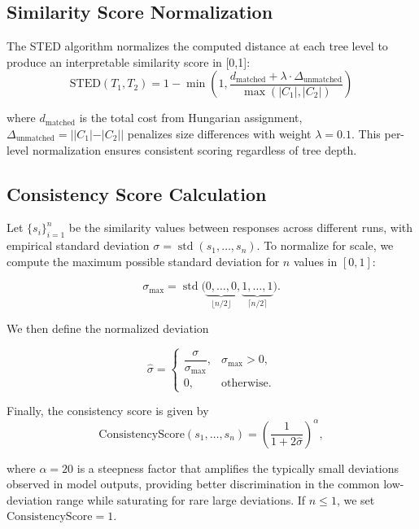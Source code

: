 \documentclass{article}
\begin{document}
\subsection{Similarity Score Normalization}

The STED algorithm normalizes the computed distance at each tree level to produce an interpretable similarity score in [0,1]:
\vspace{-2mm}
\begin{equation}
\text{STED}(T_1, T_2) = 1 - \min\left(1, \frac{d_{\text{matched}} + \lambda \cdot \Delta_{\text{unmatched}}}{\max(|C_1|, |C_2|)}\right)
\end{equation}

where $d_{\text{matched}}$ is the total cost from Hungarian assignment, $\Delta_{\text{unmatched}} = ||C_1| - |C_2||$ penalizes size differences with weight $\lambda = 0.1$. This per-level normalization ensures consistent scoring regardless of tree depth.

\subsection{Consistency Score Calculation}

Let $\{s_i\}_{i=1}^n$ be the similarity values between responses across different runs, with empirical standard deviation $\sigma = \operatorname{std}(s_1, \dots, s_n)$. To normalize for scale, we compute the maximum possible standard deviation for $n$ values in $[0,1]$:

\[
\sigma_{\max} = \operatorname{std}\big(\underbrace{0, \dots, 0}_{\lfloor n/2 \rfloor}, \underbrace{1, \dots, 1}_{\lceil n/2 \rceil}\big).
\]

We then define the normalized deviation

\[
\hat{\sigma} = 
\begin{cases}
\dfrac{\sigma}{\sigma_{\max}}, & \sigma_{\max} > 0, \\
0, & \text{otherwise}.
\end{cases}
\]

Finally, the consistency score is given by
\vspace{-2mm}
\[
\text{ConsistencyScore}(s_1,\dots,s_n) = \left( \frac{1}{1 + 2\hat{\sigma}} \right)^{\alpha},
\]

where $\alpha = 20$ is a steepness factor that amplifies the typically small deviations observed in model outputs, providing better discrimination in the common low-deviation range while saturating for rare large deviations. If $n \leq 1$, we set $\text{ConsistencyScore} = 1$.
\end{document}

